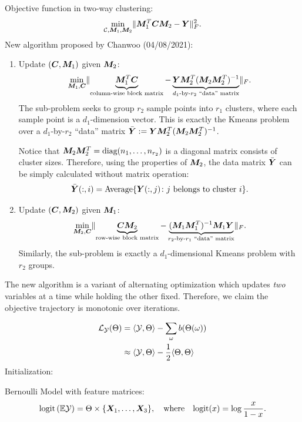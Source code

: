 \documentclass[10pt]{article}
\newcommand*{\KeepStyleUnderBrace}[1]{%
  \mathop{%
    \mathchoice
    {\underbrace{\displaystyle#1}}%
    {\underbrace{\textstyle#1}}%
    {\underbrace{\scriptstyle#1}}%
    {\underbrace{\scriptscriptstyle#1}}%
  }\limits
}
\theoremstyle{definition}
\theoremstyle{definition}
\theoremstyle{definition}
\begin{document}
Objective function in two-way clustering:
\[
\min_{\mathcal{C},\bm M_1,\bm M_2}\lVert\bm M^T_1\bm C\bm M_2-\bm Y\rVert_F^2.
\]
New algorithm proposed by Chanwoo (04/08/2021): 
\begin{enumerate}
\item Update $(\bm C, \bm M_1)$ given $\bm M_2$: 
\[
\min_{\mM_1,\mC}\FnormSize{}{\KeepStyleUnderBrace{\mM^T_1\mC}_{\text{column-wise block matrix}}-\KeepStyleUnderBrace{\mY\mM_2^T(\mM_2\mM^T_2)^{-1}}_{\text{$d_1$-by-$r_2$ ``data'' matrix}}}.
\] 
The sub-problem seeks to group $r_2$ sample points into $r_1$ clusters, where each sample point is a $d_1$-dimension vector. This is exactly the Kmeans problem over a $d_1$-by-$r_2$ ``data'' matrix $\bar {\bm Y}:=\bm Y\bm M_2^T(\bm M_2\bm M^T_2)^{-1}$. 

Notice that $\bm M_2\bm M^T_2=\text{diag}(n_1,\ldots,n_{r_2})$ is a diagonal matrix consists of cluster sizes. Therefore, using the properties of $\bm M_2$, the data matrix $\bar {\bm Y}$ can be simply calculated without matrix operation:
\[
\bar{\bm Y}(:,i)=\text{Average}\{\bm Y(:,j)\colon j \text{ belongs to cluster $i$}\}. 
\]

\item Update $(\bm C, \bm M_2)$ given $\bm M_1$:
\[
\min_{\mM_2,\mC}\FnormSize{}{\KeepStyleUnderBrace{\mC\mM_2}_{\text{row-wise block matrix}}-\KeepStyleUnderBrace{(\mM_1\mM^T_1)^{-1}\mM_1\mY}_{\text{$r_2$-by-$r_1$ ``data'' matrix}}}.
\] 
Similarly, the sub-problem is exactly a $d_1$-dimensional Kmeans problem with $r_2$ groups. 
\end{enumerate}
The new algorithm is a variant of alternating optimization which updates \emph{two} variables at a time while holding the other fixed. Therefore, we claim the objective trajectory is monotonic over iterations. 

\begin{align}
\mathcal{L}_{\mathcal{Y}}(\Theta)&=\langle \mathcal{Y}, \Theta \rangle - \sum_{\omega}b(\Theta(\omega))\\
&\approx \langle \mathcal{Y}, \Theta \rangle - {1\over 2}\langle \Theta, \Theta \rangle
\end{align}
Initialization:

Bernoulli Model with feature matrices: 
\begin{equation}\label{eq:model}
\text{logit}\left(\mathbb{E}\mathcal{Y} \right)=\Theta\times\{\bm X_1,\ldots,\bm X_3\},\quad \text{where}\quad \text{logit}(x)=\log{x\over 1-x}.
\end{equation}
\end{document}
